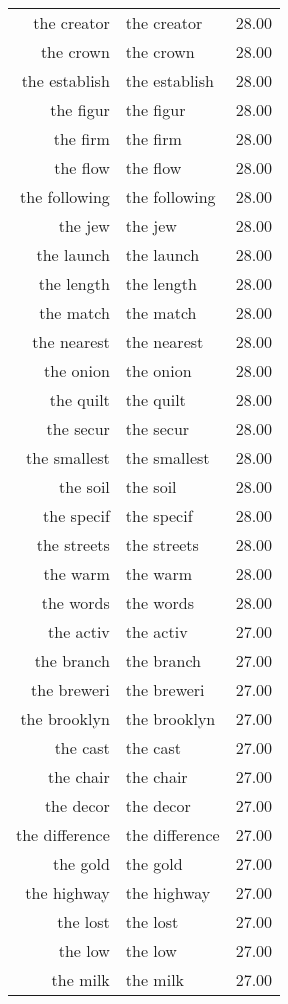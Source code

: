 \begin{table}[ht]
\begin{tabular}{rlr}
  the creator & the creator & 28.00 \\ 
  the crown & the crown & 28.00 \\ 
  the establish & the establish & 28.00 \\ 
  the figur & the figur & 28.00 \\ 
  the firm & the firm & 28.00 \\ 
  the flow & the flow & 28.00 \\ 
  the following & the following & 28.00 \\ 
  the jew & the jew & 28.00 \\ 
  the launch & the launch & 28.00 \\ 
  the length & the length & 28.00 \\ 
  the match & the match & 28.00 \\ 
  the nearest & the nearest & 28.00 \\ 
  the onion & the onion & 28.00 \\ 
  the quilt & the quilt & 28.00 \\ 
  the secur & the secur & 28.00 \\ 
  the smallest & the smallest & 28.00 \\ 
  the soil & the soil & 28.00 \\ 
  the specif & the specif & 28.00 \\ 
  the streets & the streets & 28.00 \\ 
  the warm & the warm & 28.00 \\ 
  the words & the words & 28.00 \\ 
  the activ & the activ & 27.00 \\ 
  the branch & the branch & 27.00 \\ 
  the breweri & the breweri & 27.00 \\ 
  the brooklyn & the brooklyn & 27.00 \\ 
  the cast & the cast & 27.00 \\ 
  the chair & the chair & 27.00 \\ 
  the decor & the decor & 27.00 \\ 
  the difference & the difference & 27.00 \\ 
  the gold & the gold & 27.00 \\ 
  the highway & the highway & 27.00 \\ 
  the lost & the lost & 27.00 \\ 
  the low & the low & 27.00 \\ 
  the milk & the milk & 27.00 \\ 

\end{tabular}
\end{table}
